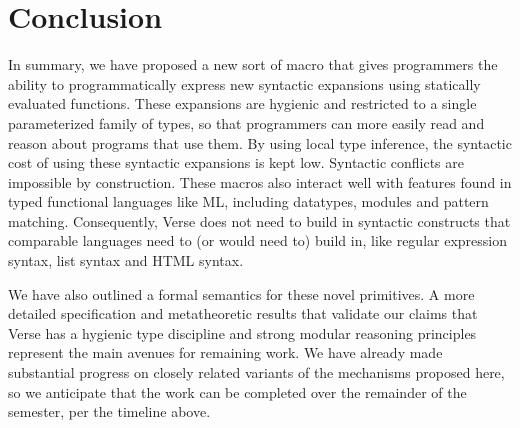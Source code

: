 \section{Conclusion}\label{sec:conclusion}


In summary, we have proposed a new sort of macro that gives programmers the ability to programmatically express new syntactic expansions using statically evaluated functions. These expansions are hygienic and restricted  to a single parameterized family of types, so that programmers can more easily read and reason about programs that use them. By using local type inference, the syntactic cost of using these syntactic expansions is kept low. Syntactic conflicts are impossible by construction. These macros also interact well with features found in typed functional languages like ML, including datatypes, modules and pattern matching. Consequently, Verse does not need to build in syntactic constructs that comparable languages need to (or would need to) build in, like regular expression syntax, list syntax and HTML syntax.  %

We have also outlined a formal semantics for these novel primitives. A more detailed specification and metatheoretic results that validate our claims that Verse has a hygienic type discipline and strong modular reasoning principles represent the main avenues for remaining work. We have already made substantial progress on closely related variants of the mechanisms proposed here, so we anticipate that the work can be completed over the remainder of the semester, per the timeline above. 





